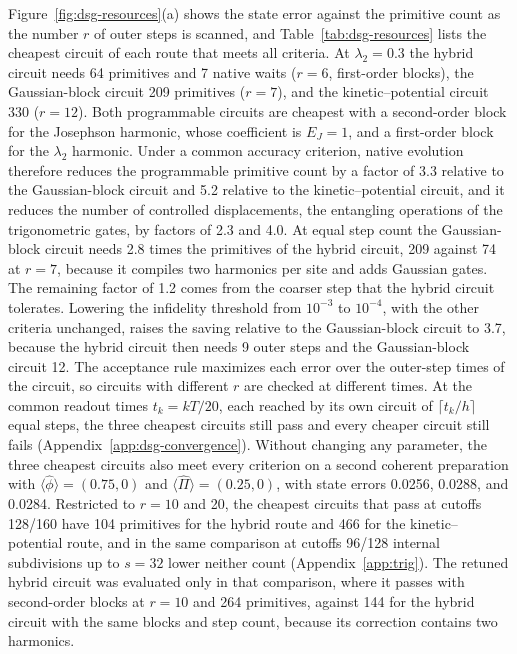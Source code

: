 \documentclass[pra,twocolumn,superscriptaddress,nofootinbib,floatfix]{revtex4-2}
\theoremstyle{remark}
\begin{document}
Figure~\ref{fig:dsg-resources}(a) shows the state error against the primitive count as the number \(r\) of outer steps is scanned, and Table~\ref{tab:dsg-resources} lists the cheapest circuit of each route that meets all criteria. At \(\lambda_2=0.3\) the hybrid circuit needs 64 primitives and 7 native waits (\(r=6\), first-order blocks), the Gaussian-block circuit 209 primitives (\(r=7\)), and the kinetic--potential circuit 330 (\(r=12\)). Both programmable circuits are cheapest with a second-order block for the Josephson harmonic, whose coefficient is \(E_J=1\), and a first-order block for the \(\lambda_2\) harmonic. Under a common accuracy criterion, native evolution therefore reduces the programmable primitive count by a factor of 3.3 relative to the Gaussian-block circuit and 5.2 relative to the kinetic--potential circuit, and it reduces the number of controlled displacements, the entangling operations of the trigonometric gates, by factors of 2.3 and 4.0. At equal step count the Gaussian-block circuit needs 2.8 times the primitives of the hybrid circuit, 209 against 74 at \(r=7\), because it compiles two harmonics per site and adds Gaussian gates. The remaining factor of 1.2 comes from the coarser step that the hybrid circuit tolerates. Lowering the infidelity threshold from \(10^{-3}\) to \(10^{-4}\), with the other criteria unchanged, raises the saving relative to the Gaussian-block circuit to 3.7, because the hybrid circuit then needs 9 outer steps and the Gaussian-block circuit 12. The acceptance rule maximizes each error over the outer-step times of the circuit, so circuits with different \(r\) are checked at different times. At the common readout times \(t_k=kT/20\), each reached by its own circuit of \(\lceil t_k/h\rceil\) equal steps, the three cheapest circuits still pass and every cheaper circuit still fails (Appendix~\ref{app:dsg-convergence}). Without changing any parameter, the three cheapest circuits also meet every criterion on a second coherent preparation with \(\langle\hat\phi\rangle=(0.75,0)\) and \(\langle\hat\Pi\rangle=(0.25,0)\), with state errors 0.0256, 0.0288, and 0.0284. Restricted to \(r=10\) and 20, the cheapest circuits that pass at cutoffs 128/160 have 104 primitives for the hybrid route and 466 for the kinetic--potential route, and in the same comparison at cutoffs 96/128 internal subdivisions up to \(s=32\) lower neither count (Appendix~\ref{app:trig}). The retuned hybrid circuit was evaluated only in that comparison, where it passes with second-order blocks at \(r=10\) and 264 primitives, against 144 for the hybrid circuit with the same blocks and step count, because its correction contains two harmonics.
\end{document}
